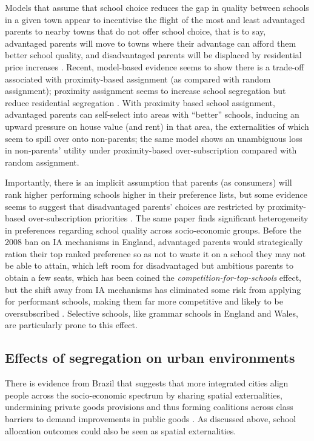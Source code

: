 \documentclass{article}
\begin{document}
\begin{multicols}{2}
Models that assume that school choice reduces the gap in quality between schools in a given town appear to incentivise the flight of the most and least advantaged parents to nearby towns that do not offer school choice, that is to say, advantaged parents will move to towns where their advantage can afford them better school quality, and disadvantaged parents will be displaced by residential price increases \cite{averyDistributionalConsequencesPublic2021}. Recent, model-based evidence seems to show there is a trade-off associated with proximity-based assignment (as compared with random assignment); proximity assignment seems to increase school segregation but reduce residential segregation \cite{greavesSchoolChoiceNeighborhood2024}. With proximity based school assignment, advantaged parents can self-select into areas with ``better'' schools, inducing an upward pressure on house value (and rent) in that area, the externalities of which seem to spill over onto non-parents; the same model shows an unambiguous loss in non-parents' utility under proximity-based over-subscription compared with random assignment.

Importantly, there is an implicit assumption that parents (as consumers) will rank higher performing schools higher in their preference lists, but some evidence seems to suggest that disadvantaged parents' choices are restricted by proximity-based over-subscription priorities \cite{burgessWhatParentsWant2015}. The same paper finds significant heterogeneity in preferences regarding school quality across socio-economic groups. Before the 2008 ban on IA mechanisms in England, advantaged parents would strategically ration their top ranked preference so as not to waste it on a school they may not be able to attain, which left room for disadvantaged but ambitious parents to obtain a few seats, which has been coined the \textit{competition-for-top-schools} effect, but the shift away from IA mechanisms has eliminated some risk from applying for performant schools, making them far more competitive and likely to be oversubscribed \cite{pathakSchoolAdmissionsReform2013}. Selective schools, like grammar schools in England and Wales, are particularly prone to this effect.

\subsection{Effects of segregation on urban environments}
There is evidence from Brazil that suggests that more integrated cities align people across the socio-economic spectrum by sharing spatial externalities, undermining private goods provisions and thus forming coalitions across class barriers to demand improvements in public goods \cite{xuSegregationSpatialExternalities2024}. As discussed above, school allocation outcomes could also be seen as spatial externalities.


\end{multicols}
\end{document}
